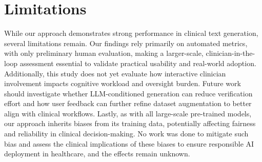 \section{Limitations}
While our approach demonstrates strong performance in clinical text generation, several limitations remain. Our findings rely primarily on automated metrics, with only preliminary human evaluation, making a larger-scale, clinician-in-the-loop assessment essential to validate practical usability and real-world adoption. Additionally, this study does not yet evaluate how interactive clinician involvement impacts cognitive workload and oversight burden. Future work should investigate whether LLM-conditioned generation can reduce verification effort and how user feedback can further refine dataset augmentation to better align with clinical workflows. Lastly, as with all large-scale pre-trained models, our approach inherits biases from its training data, potentially affecting fairness and reliability in clinical decision-making. No work was done to mitigate such bias and assess the clinical implications of these biases to ensure responsible AI deployment in healthcare, and the effects remain unknown.